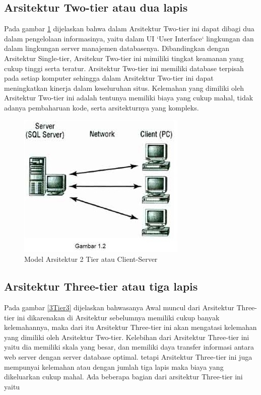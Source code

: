 \subsection{Arsitektur Two-tier atau dua lapis}
Pada gambar \ref{2Tier2} dijelaskan bahwa dalam Arsitektur Two-tier ini dapat dibagi dua dalam pengelolaan informasinya, yaitu dalam UI `User Interface` lingkungan dan dalam
lingkungan server manajemen databasenya. Dibandingkan dengan Arsitektur Single-tier, Arsitekur Two-tier ini mimiliki tingkat
keamanan yang cukup tinggi serta teratur. Arsitektur Two-tier ini memiliki database terpisah pada setiap komputer sehingga dalam
Arsitektur Two-tier ini dapat meningkatkan kinerja dalam keseluruhan situs. Kelemahan yang dimiliki oleh Arsitektur Two-tier ini
adalah tentunya memiliki biaya yang cukup mahal, tidak adanya pembaharuan kode, serta arsitekturnya yang kompleks.

\begin{figure}[ht]
    \centerline{\includegraphics{figures/2model2tier.JPG}}
    \caption{Model Arsitektur 2 Tier atau Client-Server}
    \label{2Tier2}
\end{figure}

\subsection{Arsitektur Three-tier atau tiga lapis}
    Pada gambar \ref{3Tier3} dijelaskan bahwasanya Awal muncul dari Arsitektur Three-tier ini dikarenakan 
di Arsitektur sebelumnya memiliki cukup banyak kelemahannya, maka dari itu Arsitektur Three-tier ini akan mengatasi kelemahan yang 
dimiliki oleh Arsitektur Two-tier. Kelebihan dari Arsitektur Three-tier ini yaitu dia memiliki skala yang besar, dan memiliki daya 
transfer informasi antara web server dengan server database optimal. tetapi Arsitektur Three-tier ini juga mempunyai kelemahan atau dengan jumlah tiga lapis maka biaya yang dikeluarkan cukup mahal. Ada beberapa bagian dari arsitektur Three-tier ini yaitu 


